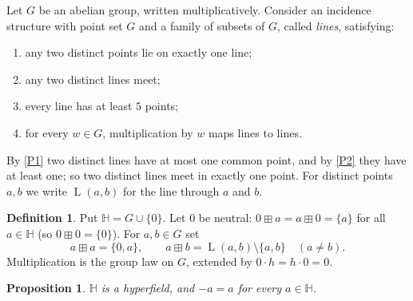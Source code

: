 \documentclass[11pt]{article}
\newtheorem{proposition}[theorem]{Proposition}
\theoremstyle{definition}
\newtheorem{definition}[theorem]{Definition}
\theoremstyle{remark}
\newcommand{\HH}{\mathbb{H}}
\newcommand{\bp}{\boxplus}
\DeclareMathOperator{\Ln}{L}
\begin{document}
Let $G$ be an abelian group, written multiplicatively. Consider an incidence structure with point set $G$ and a family of subsets of $G$, called \emph{lines}, satisfying:
\begin{enumerate}[label=\textup{(P\arabic*)},nosep]
\item\label{P1} any two distinct points lie on exactly one line;
\item\label{P2} any two distinct lines meet;
\item\label{P3} every line has at least $5$ points;
\item\label{P4} for every $w\in G$, multiplication by $w$ maps lines to lines.
\end{enumerate}
By \ref{P1} two distinct lines have at most one common point, and by \ref{P2} they have at least one; so two distinct lines meet in exactly one point. For distinct points $a,b$ we write $\Ln(a,b)$ for the line through $a$ and $b$.

\begin{definition}\label{def:H}
Put $\HH=G\cup\{0\}$. Let $0$ be neutral: $0\bp a=a\bp 0=\{a\}$ for all $a\in\HH$ (so $0\bp0=\{0\}$). For $a,b\in G$ set
\[
a\bp a=\{0,a\},\qquad a\bp b=\Ln(a,b)\setminus\{a,b\}\quad(a\neq b).
\]
Multiplication is the group law on $G$, extended by $0\cdot h=h\cdot 0=0$.
\end{definition}

\begin{proposition}\label{prop:hyperfield}
$\HH$ is a hyperfield, and $-a=a$ for every $a\in\HH$.
\end{proposition}
\end{document}
